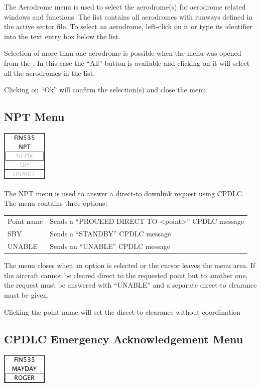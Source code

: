 \documentclass[11pt,a4paper]{memoir}
\newenvironment{Warn}
  {\begin{shaded}\marginnote{\fbox{Warning}}}
  {\end{shaded}}
\begin{document}
The Aerodrome menu is used to select the aerodrome(s) for aerodrome related windows and functions. The list contains all aerodromes with runways defined in the active sector file. To select an aerodrome, left-click on it or type its identifier into the text entry box below the list.

Selection of more than one aerodrome is possible when the menu was opened from the \textit{}. In this case the “All” button is available and clicking on it will select all the aerodromes in the list.

Clicking on “Ok” will confirm the selection(s) and close the menu.

\subsection{NPT Menu}
\label{menu:npt}
\includegraphics{img/npt.png}

The NPT menu is used to answer a direct-to downlink request using CPDLC. The menu
contains three options:

\begin{tabular}{l l}
Point name  & Sends a “PROCEED DIRECT TO <point>” CPDLC message\\
SBY         & Sends a “STANDBY” CPDLC message\\
UNABLE      & Sends an “UNABLE” CPDLC message\\   
\end{tabular}

The menu closes when an option is selected or the cursor leaves the menu area. If the aircraft cannot be cleared direct to the requested point but to another one, the request must be answered with “UNABLE” and a separate direct-to clearance must be given.

\begin{Warn}
Clicking the point name will set the direct-to clearance without coordination
\end{Warn}

\subsection{CPDLC Emergency Acknowledgement Menu}
\label{dleam}
\includegraphics{img/dlmayday.png}
\end{document}
